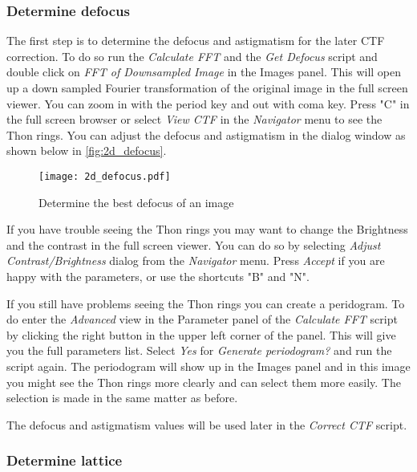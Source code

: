 \subsubsection{Determine defocus}
\label{sec:defocus}

The first step is to determine the defocus and astigmatism for the later CTF correction. To do so run the  \textit{Calculate FFT}  and the \textit{Get Defocus} script and double click on \textit{FFT of Downsampled Image} in the Images panel. This will open up a down sampled Fourier transformation of the original image in the full screen viewer. You can zoom in with the period key and out with coma key. Press "C" in the full screen browser or select \textit{View CTF} in the \textit{Navigator} menu to see the Thon rings. You can adjust the defocus and astigmatism in the dialog window as shown below in \autoref{fig:2d_defocus}.
	
	\begin{figure}[H]
		\centering
		\texttt{[image: 2d\_defocus.pdf]}
		\caption{Determine the best defocus of an image}
		\label{fig:2d_defocus}
	\end{figure}

	If you have trouble seeing the Thon rings you may want to change the Brightness and the contrast in the full screen viewer. You can do so by selecting \textit{Adjust Contrast/Brightness} dialog from the \textit{Navigator} menu. Press \textit{Accept} if you are happy with the parameters, or use the shortcuts "B" and "N".
	
	If you still have problems seeing the Thon rings you can create a peridogram. To do enter the \textit{Advanced} view in the Parameter panel of the \textit{Calculate FFT} script by clicking the right button in the upper left corner of the panel. This will give you the full parameters list. Select \textit{Yes} for \textit{Generate periodogram?} and run the script again. The periodogram will show up in the Images panel and in this image you might see the Thon rings more clearly and can select them more easily. The selection is made in the same matter as before. 
	
	The defocus and astigmatism values will be used later in the \textit{Correct CTF} script.
	
\subsubsection{Determine lattice}	
	
